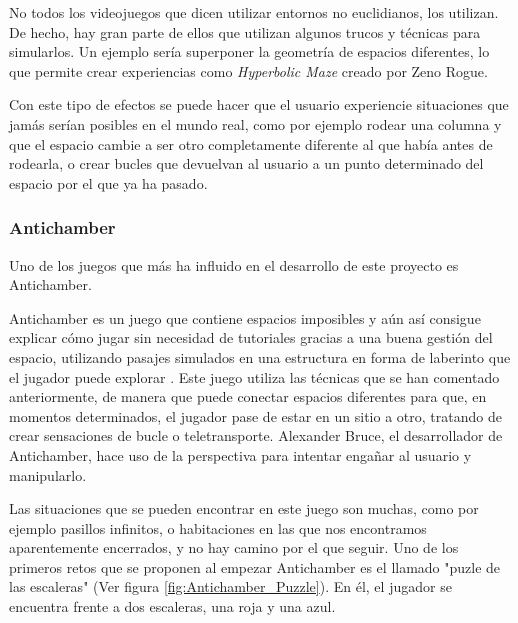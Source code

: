 \documentclass[../main.tex]{subfiles}
\begin{document}
No todos los videojuegos que dicen utilizar entornos no euclidianos, los utilizan. De hecho, hay gran parte de ellos que utilizan algunos trucos y técnicas para simularlos. Un ejemplo sería superponer la geometría de espacios diferentes, lo que permite crear experiencias como \textit{Hyperbolic Maze} \cite{Hyperbolic_Maze} creado por Zeno Rogue.

Con este tipo de efectos se puede hacer que el usuario experiencie situaciones que jamás serían posibles en el mundo real, como por ejemplo rodear una columna y que el espacio cambie a ser otro completamente diferente al que había antes de rodearla, o crear bucles que devuelvan al usuario a un punto determinado del espacio por el que ya ha pasado.

\subsubsection{Antichamber}

Uno de los juegos que más ha influido en el desarrollo de este proyecto es Antichamber.

Antichamber es un juego que contiene espacios imposibles y aún así consigue explicar cómo jugar sin necesidad de tutoriales gracias a una buena gestión del espacio, utilizando pasajes simulados en una estructura en forma de laberinto que el jugador puede explorar \cite{Antichamber}. Este juego utiliza las técnicas que se han comentado anteriormente, de manera que puede conectar espacios diferentes para que, en momentos determinados, el jugador pase de estar en un sitio a otro, tratando de crear sensaciones de bucle o teletransporte. Alexander Bruce, el desarrollador de Antichamber, hace uso de la perspectiva para intentar engañar al usuario y manipularlo.

Las situaciones que se pueden encontrar en este juego son muchas, como por ejemplo pasillos infinitos, o habitaciones en las que nos encontramos aparentemente encerrados, y no hay camino por el que seguir. Uno de los primeros retos que se proponen al empezar Antichamber es el llamado "puzle de las escaleras" (Ver figura \ref{fig:Antichamber_Puzzle}). En él, el jugador se encuentra frente a dos escaleras, una roja y una azul.
\end{document}
